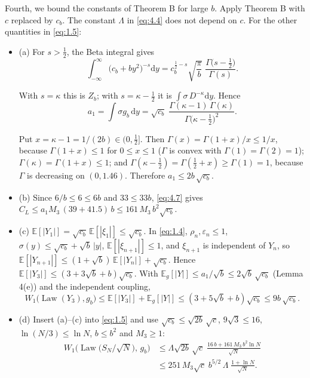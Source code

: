 \documentclass[aip,jmp,preprint,onecolumn,floatfix,superscriptaddress,nofootinbib,11pt]{revtex4-2}
\theoremstyle{plain}
\theoremstyle{remark}
\numberwithin{equation}{section}
\newcommand{\dd}{\mathrm{d}}
\newcommand{\E}{\mathbb{E}}
\newcommand{\eps}{\varepsilon}
\newcommand{\Law}{\operatorname{Law}}
\begin{document}
Fourth, we bound the constants of Theorem B for large $b$. Apply Theorem B with $c$ replaced by $c_b$. The constant $\Lambda$ in \eqref{eq:4.4} does not depend on $c$. For the other quantities in \eqref{eq:1.5}:

\begin{itemize}
\item (a) For $s>\tfrac12$, the Beta integral gives
\begin{equation}
\int_{-\infty}^{\infty}\big(c_b+by^{2}\big)^{-s}\dd y=c_b^{\frac12-s}\sqrt{\frac\pi b}\;\frac{\Gamma\big(s-\frac12\big)}{\Gamma(s)} .
\label{eq:5.2}
\end{equation}

      With $s=\kappa$ this is $Z_b$; with $s=\kappa-\tfrac12$ it is $\int\sigma\,D^{-\kappa}\dd y$. Hence
\begin{equation*}
a_1=\int\sigma g_b\,\dd y=\sqrt{c_b}\;\frac{\Gamma(\kappa-1)\,\Gamma(\kappa)}{\Gamma\big(\kappa-\frac12\big)^{2}} .
\end{equation*}

      Put $x=\kappa-1=1/(2b)\in(0,\tfrac12]$. Then $\Gamma(x)=\Gamma(1+x)/x\le1/x$, because $\Gamma(1+x)\le1$ for $0\le x\le1$ ($\Gamma$ is convex with $\Gamma(1)=\Gamma(2)=1$); $\Gamma(\kappa)=\Gamma(1+x)\le1$; and $\Gamma(\kappa-\tfrac12)=\Gamma(\tfrac12+x)\ge\Gamma(1)=1$, because $\Gamma$ is decreasing on $(0,1.46)$. Therefore $a_1\le2b\,\sqrt{c_b}$.
\item (b) Since $6/b\le6\le6b$ and $33\le33b$, \eqref{eq:4.7} gives $C_L\le a_1M_3\,(39+41.5)\,b\le161\,M_3\,b^{2}\sqrt{c_b}$.
\item (c) $\E[|Y_1|]=\sqrt{c_b}\,\E[|\xi_1|]\le\sqrt{c_b}$. In \eqref{eq:1.4}, $\rho_n,\eps_n\le1$, $\sigma(y)\le\sqrt{c_b}+\sqrt b\,|y|$, $\E[|\xi_{n+1}|]\le1$, and $\xi_{n+1}$ is independent of $Y_n$, so $\E[|Y_{n+1}|]\le(1+\sqrt b)\,\E[|Y_n|]+\sqrt{c_b}$. Hence $\E[|Y_3|]\le(3+3\sqrt b+b)\sqrt{c_b}$. With $\E_{g}[|Y|]\le a_1/\sqrt b\le2\sqrt b\,\sqrt{c_b}$ (Lemma 4(e)) and the independent coupling,
\begin{equation*}
W_1\big(\Law(Y_3),g_b\big)\le\E[|Y_3|]+\E_{g}[|Y|]\le(3+5\sqrt b+b)\sqrt{c_b}\le9b\,\sqrt{c_b}.
\end{equation*}

\item (d) Insert (a)--(c) into \eqref{eq:1.5} and use $\sqrt{c_b}\le\sqrt{2b}\,\sqrt c$, $9\sqrt3\le16$, $\ln(N/3)\le\ln N$, $b\le b^{2}$ and $M_3\ge1$:
\begin{equation}
\begin{aligned} W_1\Big(\Law\big(S_N/\sqrt N\big),\,g_b\Big)&\le\Lambda\sqrt{2b}\,\sqrt c\;\frac{16\,b+161\,M_3\,b^{2}\ln N}{\sqrt N}\\[4pt] &\le251\,M_3\sqrt c\;b^{5/2}\,\Lambda\;\frac{1+\ln N}{\sqrt N}. \end{aligned}
\label{eq:5.3}
\end{equation}

\end{itemize}
\end{document}
